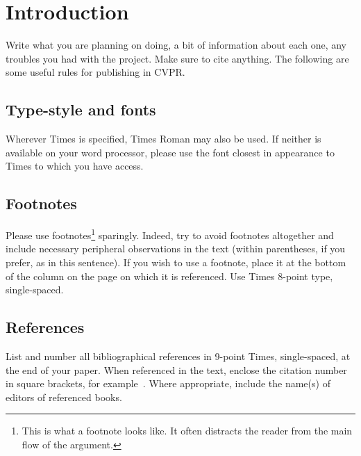 \documentclass[12pt,twoside,a4paper]{article}
\title{\mytitle}
\author{\myauthors}
\date{\mydate}
\begin{document}
\maketitle


\begin{abstract}
Brief Abstract describing the project.
\end{abstract}
\vspace{1ex}
\tableofcontents
\vfill
\pagebreak

\section{Introduction}
Write what you are planning on doing, a bit of information about each one, any troubles you had with the project.  Make sure to cite anything.  The following are some useful rules for publishing in CVPR. 


\subsection{Type-style and fonts}

Wherever Times is specified, Times Roman may also be used. If neither is
available on your word processor, please use the font closest in
appearance to Times to which you have access.

\subsection{Footnotes}

Please use footnotes\footnote {This is what a footnote looks like.  It
often distracts the reader from the main flow of the argument.} sparingly.
Indeed, try to avoid footnotes altogether and include necessary peripheral
observations in
the text (within parentheses, if you prefer, as in this sentence).  If you
wish to use a footnote, place it at the bottom of the column on the page on
which it is referenced. Use Times 8-point type, single-spaced.

\subsection{References}

List and number all bibliographical references in 9-point Times,
single-spaced, at the end of your paper. When referenced in the text,
enclose the citation number in square brackets, for
example~\cite{ChrisPRML}.  Where appropriate, include the name(s) of
editors of referenced books.
\end{document}
